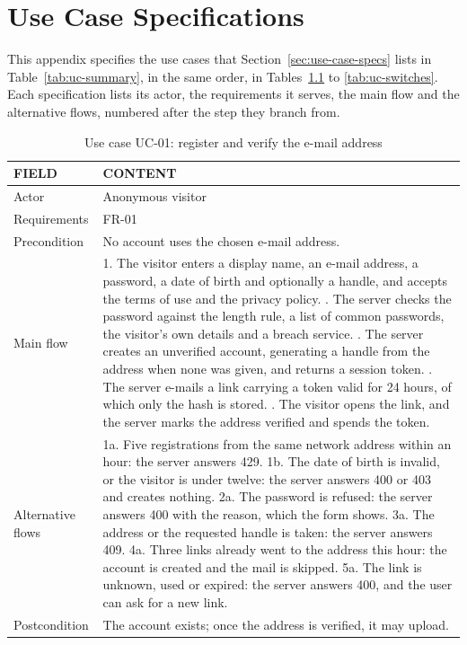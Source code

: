 \chapter{Use Case Specifications}
\label{app:use-cases}

This appendix specifies the use cases that Section~\ref{sec:use-case-specs} lists in
Table~\ref{tab:uc-summary}, in the same order, in Tables~\ref{tab:uc-register} to \ref{tab:uc-switches}.
Each specification lists its actor, the requirements it serves, the main flow and the alternative
flows, numbered after the step they branch from.

\begin{table}[H]
\centering
\caption{Use case UC-01: register and verify the e-mail address}
\label{tab:uc-register}
\small
\begin{tabularx}{\textwidth}{p{} X}
\toprule
\textbf{FIELD} & \textbf{CONTENT} \\
\midrule
Actor & Anonymous visitor \\
Requirements & FR-01 \\
Precondition & No account uses the chosen e-mail address. \\
Main flow &
  1. The visitor enters a display name, an e-mail address, a password, a date of birth and optionally a handle, and accepts the terms of use and the privacy policy. \newline
  2. The server checks the password against the length rule, a list of common passwords, the visitor's own details and a breach service. \newline
  3. The server creates an unverified account, generating a handle from the address when none was given, and returns a session token. \newline
  4. The server e-mails a link carrying a token valid for 24 hours, of which only the hash is stored. \newline
  5. The visitor opens the link, and the server marks the address verified and spends the token. \\
Alternative flows &
  1a. Five registrations from the same network address within an hour: the server answers 429. \newline
  1b. The date of birth is invalid, or the visitor is under twelve: the server answers 400 or 403 and creates nothing. \newline
  2a. The password is refused: the server answers 400 with the reason, which the form shows. \newline
  3a. The address or the requested handle is taken: the server answers 409. \newline
  4a. Three links already went to the address this hour: the account is created and the mail is skipped. \newline
  5a. The link is unknown, used or expired: the server answers 400, and the user can ask for a new link. \\
Postcondition & The account exists; once the address is verified, it may upload. \\
\bottomrule
\end{tabularx}
\end{table}

